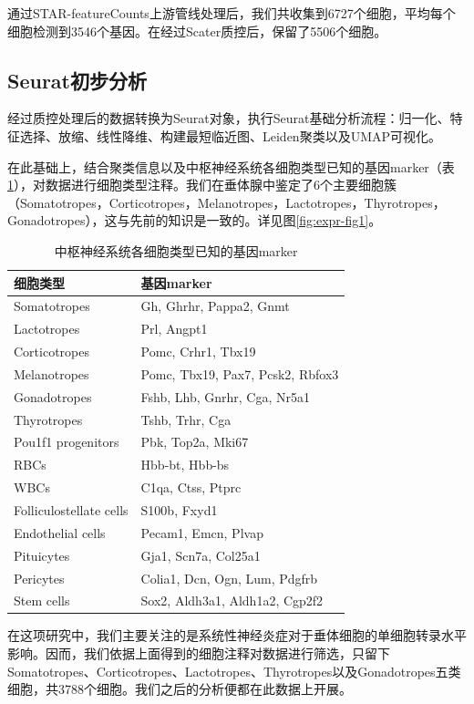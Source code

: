   通过STAR-featureCounts上游管线处理后，我们共收集到6727个细胞，平均每个细胞检测到3546个基因。在经过Scater质控后，保留了5506个细胞。
\subsection{Seurat初步分析}
  经过质控处理后的数据转换为Seurat对象，执行Seurat基础分析流程：归一化、特征选择、放缩、线性降维、构建最短临近图、Leiden聚类以及UMAP可视化。

  在此基础上，结合聚类信息以及中枢神经系统各细胞类型已知的基因marker（表\ref{tab:gene-marker}），对数据进行细胞类型注释。我们在垂体腺中鉴定了6个主要细胞簇（Somatotropes，Corticotropes，Melanotropes，Lactotropes，Thyrotropes，Gonadotropes），这与先前的知识是一致的。详见图\ref{fig:expr-fig1}。
\begin{table}[ht]
    \centering
    \caption{中枢神经系统各细胞类型已知的基因marker}
    \label{tab:gene-marker}
    \begin{tabular}{ll}
        \toprule
        细胞类型 & 基因marker \\
        \midrule
        Somatotropes & Gh, Ghrhr, Pappa2, Gnmt \\
        Lactotropes & Prl, Angpt1 \\
        Corticotropes & Pomc, Crhr1, Tbx19 \\
        Melanotropes & Pomc, Tbx19, Pax7, Pcsk2, Rbfox3 \\
        Gonadotropes & Fshb, Lhb, Gnrhr, Cga, Nr5a1 \\
        Thyrotropes & Tshb, Trhr, Cga \\
        Pou1f1 progenitors & Pbk, Top2a, Mki67 \\
        RBCs & Hbb-bt, Hbb-bs \\
        WBCs & C1qa, Ctss, Ptprc \\
        Folliculostellate cells & S100b, Fxyd1 \\
        Endothelial cells & Pecam1, Emcn, Plvap \\
        Pituicytes & Gja1, Scn7a, Col25a1 \\
        Pericytes & Colia1, Dcn, Ogn, Lum, Pdgfrb \\
        Stem cells & Sox2, Aldh3a1, Aldh1a2, Cgp2f2 \\
        \bottomrule
    \end{tabular}
\end{table}

  在这项研究中，我们主要关注的是系统性神经炎症对于垂体细胞的单细胞转录水平影响。因而，我们依据上面得到的细胞注释对数据进行筛选，只留下Somatotropes、Corticotropes、Lactotropes、Thyrotropes以及Gonadotropes五类细胞，共3788个细胞。我们之后的分析便都在此数据上开展。

